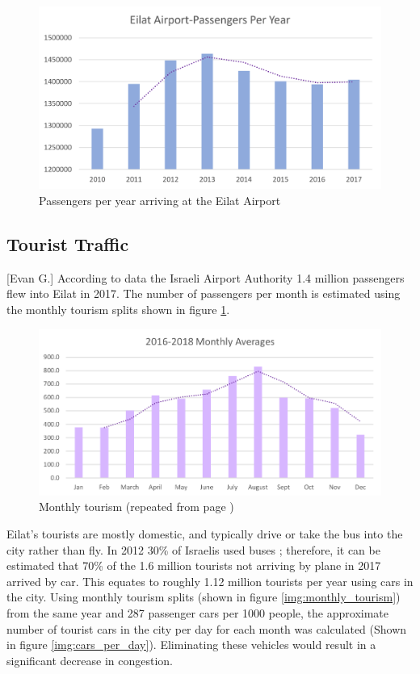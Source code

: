 \documentclass[12pt]{article}                               %
\newcommand{\repeatcaption}[2]{                             %
  \renewcommand{\thefigure}{\ref{#1}}
  \captionsetup{list=no}
  \caption{#2 (repeated from page \pageref{#1})}
}
\begin{document}
\begin{figure}[H]
    \centering
    \includegraphics[width=1\textwidth]{images/passengers_per_year.png}
    \caption{Passengers per year arriving at the Eilat Airport}
    \label{img:passengers_per_year}
\end{figure}

\subsection{Tourist Traffic}[Evan G.]
According to data the Israeli Airport Authority 1.4 million passengers flew into Eilat in 2017. The number of passengers per month is estimated using the monthly tourism splits shown in figure \ref{img:passengers_per_year}.

\begin{figure}[H]
    \centering
    \includegraphics[width=1\textwidth]{images/monthy_tourism_averages.png}
    \repeatcaption{img:monthly_tourism}{Monthly tourism}
\end{figure}

Eilat's tourists are mostly domestic, and typically drive or take the bus into the city rather than fly. In 2012 30\% of Israelis used buses \cite{Port2Port2012NewTransit,Petersburg2012LessTransit}; therefore, it can be estimated that 70\% of the 1.6 million tourists not arriving by plane in 2017 arrived by car. This equates to roughly 1.12 million tourists per year using cars in the city. Using monthly tourism splits (shown in figure \ref{img:monthly_tourism}) from the same year and 287 passenger cars per 1000 people, the approximate number of tourist cars in the city per day for each month was calculated (Shown in figure \ref{img:cars_per_day}). Eliminating these vehicles would result in a significant decrease in congestion.
\end{document}
